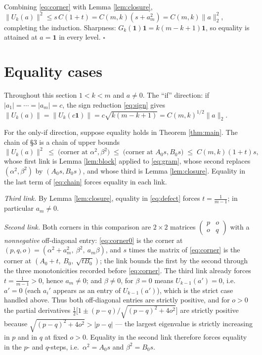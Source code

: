\documentclass[11pt]{article}
\theoremstyle{remark}
\begin{document}
Combining \eqref{eq:corner} with Lemma \ref{lem:closure},
$\|U_k(a)\|^2\le s\,C(1+t)=C(m,k)(s+a_m^2)=C(m,k)\|a\|_2^2$, completing the
induction. Sharpness: $G_k(\mathbf 1)\mathbf 1=k(m-k+1)\mathbf 1$, so
equality is attained at $a=\mathbf 1$ in every level. \hfill$\square$

\section{Equality cases}
Throughout this section $1<k<m$ and $a\ne0$. The ``if'' direction: if
$|a_1|=\cdots=|a_m|=c$, the sign reduction \eqref{eq:sign} gives
$\|U_k(a)\|=\|U_k(c\mathbf 1)\|=c\sqrt{k(m-k+1)}=C(m,k)^{1/2}\|a\|_2$.

For the only-if direction, suppose equality holds in
Theorem \ref{thm:main}. The chain of \S3 is a chain of upper bounds
\begin{equation}\label{eq:chain}
\|U_k(a)\|^2\;\le\;\text{(corner at }\alpha^2,\beta^2\text{)}
\;\le\;\text{(corner at }A_0s,B_0s\text{)}\;\le\;C(m,k)(1+t)s,
\end{equation}
whose first link is Lemma \ref{lem:block} applied to \eqref{eq:gram},
whose second replaces $(\alpha^2,\beta^2)$ by $(A_0 s,B_0 s)$, and whose
third is Lemma \ref{lem:closure}. Equality in the last term of
\eqref{eq:chain} forces equality in each link.

\emph{Third link.} By Lemma \ref{lem:closure}, equality in
\eqref{eq:defect} forces $t=\frac1{m-1}$; in particular $a_m\ne0$.

\emph{Second link.} Both corners in this comparison are $2\times2$
matrices $\begin{pmatrix} p & o\\ o & q\end{pmatrix}$ with a
\emph{nonnegative} off-diagonal entry: \eqref{eq:corner0} is the corner at
$(p,q,o)=(\alpha^2+a_m^2,\ \beta^2,\ a_m\beta)$, and $s$ times the matrix
of \eqref{eq:corner} is the corner at $(A_0+t,\ B_0,\ \sqrt{tB_0})$; the
link bounds the first by the second through the three monotonicities
recorded before \eqref{eq:corner}. The third link already forces
$t=\frac1{m-1}>0$, hence $a_m\ne0$; and $\beta\ne0$, for $\beta=0$ means
$U_{k-1}(a')=0$, i.e.\ $a'=0$ (each $a_i'$ appears as an entry of
$U_{k-1}(a')$), which is the strict case handled above. Thus both
off-diagonal entries are strictly positive, and for $o>0$ the partial
derivatives
$\tfrac12\bigl[1\pm(p-q)/\sqrt{(p-q)^2+4o^2}\bigr]$ are strictly positive
because $\sqrt{(p-q)^2+4o^2}>|p-q|$ --- the largest eigenvalue is
strictly increasing in $p$ and in $q$ at fixed $o>0$. Equality in the
second link therefore forces equality in the $p$- and $q$-steps, i.e.\
$\alpha^2=A_0 s$ and $\beta^2=B_0 s$.
\end{document}
